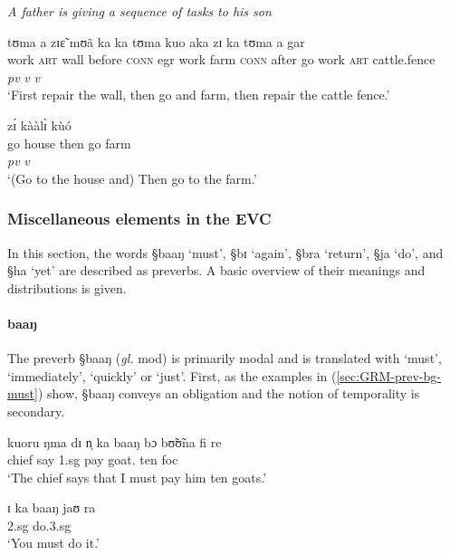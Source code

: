 \begin{exe}
\ex
\begin{xlist}
\ex\label{ex:GRM-prev-zi-1}  {\it A father is giving a sequence of tasks to
his son}

 \glll tʊma  a  zɪɛ̃  mʊã  ka  ka  tʊma  kuo   aka   zɪ ka  tʊma a  gar  \\
  {work} \textsc{art}    {wall} {before}  \textsc{conn} {\sc egr}    {work}
{farm} 
\textsc{conn} {after}  {go} {work} \textsc{art} {cattle.fence}\\  
{} {} {} {} {}  {} {} {} {} {\it pv} {\it v} {\it v} {} {}\\
\glt  `First repair the wall, then go and farm, then repair the cattle fence.'

 \ex\label{ex:GRM-prev-zi-2}
   zɪ́ kààlɪ̀ kùó\\
{go  house} then go farm\\
{} {\it pv} {\it v} {}\\
 \glt `(Go to the house and) Then go to the farm.'

\end{xlist}
\end{exe}


\subsubsection{Miscellaneous elements in the EVC}
\label{sec:GRM-preverb-misc}


In this section, the words  {\S baaŋ} `must',   {\S bɪ}
`again',  {\S bra} `return',   {\S ja} `do',  and {\S ha} `yet'  are described
as preverbs.  A basic overview of their meanings and
distributions is given.  

\paragraph{baaŋ}
\label{sec:GRM-preverb-baang}

 The preverb  {\S baaŋ}  ({\it gl.}
{\sc mod})  is primarily modal and is  translated with 
`must', `immediately', `quickly'  or `just'.  First,   as the examples in
(\ref{sec:GRM-prev-bg-must}) show,  {\S baaŋ} conveys an obligation and the
notion of temporality is secondary. 


\begin{exe}
\ex\label{sec:GRM-prev-bg-must}
\begin{xlist}
          
\ex\label{ex:GRM-7.17}
\gll  kuoru ŋma dɪ n̩ ka baaŋ bɔ bʊ̃ʊ̃na  fi re \\
 chief say {\comp} {\sc 1.sg} {\egr} {\mod}   pay  goat.{\pl} ten {\sc foc} \\
\glt  `The chief says that I must pay him ten goats.' 

\ex\label{ex:GRM-14.3}
\gll  ɪ ka baaŋ jaʊ ra\\
{\sc 2.sg} {\egr} {\mod} do.{\sc 3.sg} {\foc}\\
\glt  `You must do it.'

\end{xlist}
 \end{exe}
 

